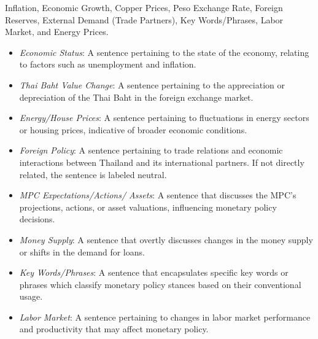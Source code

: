  Inflation, Economic Growth, Copper Prices, Peso Exchange Rate, Foreign Reserves, External Demand (Trade Partners), Key Words/Phrases, Labor Market, and Energy Prices. 
\begin{itemize}
    \item \emph{Economic Status}: A sentence pertaining to the state of the economy, relating to factors such as unemployment and inflation.
    \item \emph{Thai Baht Value Change}: A sentence pertaining to the appreciation or depreciation of the Thai Baht in the foreign exchange market.
    \item \emph{Energy/House Prices}: A sentence pertaining to fluctuations in energy sectors or housing prices, indicative of broader economic conditions.
    \item \emph{Foreign Policy}: A sentence pertaining to trade relations and economic interactions between Thailand and its international partners. If not directly related, the sentence is labeled neutral.
    \item \emph{MPC Expectations/Actions/ Assets}: A sentence that discusses the MPC's projections, actions, or asset valuations, influencing monetary policy decisions.
    \item \emph{Money Supply}: A sentence that overtly discusses changes in the money supply or shifts in the demand for loans.
    \item \emph{Key Words/Phrases}: A sentence that encapsulates specific key words or phrases which classify monetary policy stances based on their conventional usage.
    \item \emph{Labor Market}: A sentence pertaining to changes in labor market performance and productivity that may affect monetary policy.
\end{itemize}


